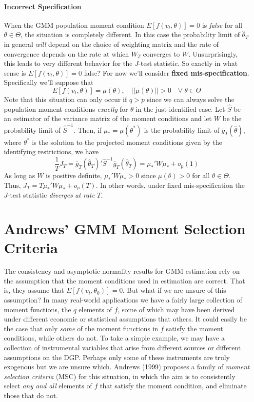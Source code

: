 \documentclass[12pt]{article}
\theoremstyle{definition}
\begin{document}
\paragraph{Incorrect Specification}
When the GMM population moment condition $E[f(v_t,\theta)]=0$ is \emph{false} for all $\theta\in \Theta$, the situation is completely different. In this case the probability limit of $\widehat{\theta}_T$ in general \emph{will} depend on the choice of weighting matrix and the rate of convergence depends on the rate at which $W_T$ converges to $W$. Unsurprisingly, this leads to very different behavior for the $J$-test statistic. So exactly in what sense is $E[f(v_t,\theta)]=0$ false? For now we'll consider \textbf{fixed mis-specification}. Specifically we'll suppose that
	$$E[f(v_t, \theta)] = \mu(\theta), \quad ||\mu(\theta)||>0 \quad \forall \; \theta\in\Theta$$
Note that this situation can only occur if $q>p$ since we can always solve the population moment conditions \emph{exactly} for $\theta$ in the just-identified case. Let $\widehat{S}$ be an estimator of the variance matrix of the moment conditions and let $W$ be the  probability limit of $\widehat{S}^{-1}$. Then, if $\mu_* = \mu(\theta^*)$ is the probability limit of $\bar{g}_T(\widehat{\theta})$, where $\theta^*$ is the solution to the projected moment conditions given by the identifying restrictions, we have
	$$\frac{1}{T} J_T = \bar{g}_T(\widehat{\theta}_T)' \widehat{S}^{-1}\bar{g}_T(\widehat{\theta}_T) = \mu_*' W \mu_* + o_p(1)$$
As long as $W$ is positive definite, $\mu_*' W \mu_*>0$ since $\mu(\theta)>0$ for all $\theta\in \Theta$. Thus, $J_T = T \mu_*' W \mu_* + o_p(T)$. In other words, under fixed mis-specification the $J$-test statistic \emph{diverges at rate} $T$. 

\section{Andrews' GMM Moment Selection Criteria}
The consistency and asymptotic normality results for GMM estimation rely on the assumption that the moment conditions used in estimation are correct. That is, they assume that $E[f(v_t,\theta_0)]=0$. But what if we are unsure of this assumption? In many real-world applications we have a fairly large collection of moment functions, the $q$ elements of $f$, some of which may have been derived under different economic or statistical assumptions that others. It could easily be the case that only \emph{some} of the moment functions in $f$ satisfy the moment conditions, while others do not. To take a simple example, we may have a collection of instrumental variables that arise from different sources or different assumptions on the DGP. Perhaps only some of these instruments are truly exogenous but we are unsure which. Andrews (1999) proposes a family of \emph{moment selection criteria} (MSC) for this situation, in which the aim is to consistently select \emph{any and all} elements of $f$ that satisfy the moment condition, and eliminate those that do not. 
\end{document}
